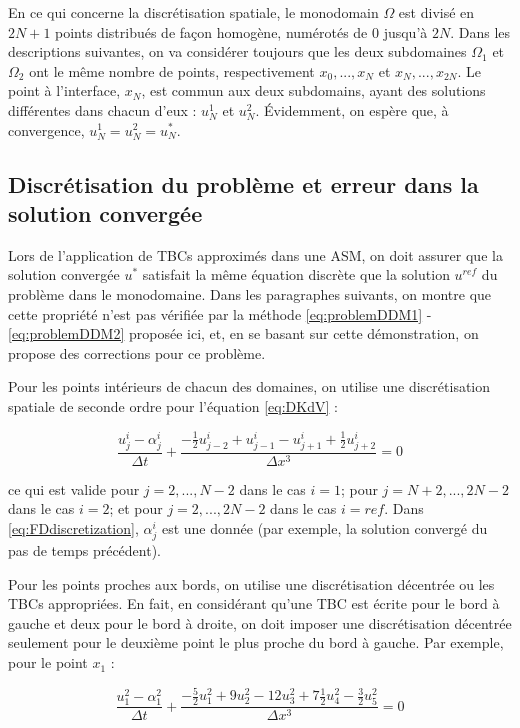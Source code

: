 \indent En ce qui concerne la discrétisation spatiale, le monodomain $\Omega$ est divisé en $2N+1$ points distribués de façon homogène, numérotés de $0$ jusqu'à $2N$. Dans les descriptions suivantes, on va considérer toujours que les deux subdomaines $\Omega_1$ et $\Omega_2$ ont le même nombre de points, respectivement  $x_0,...,x_N$ et $x_N,...,x_{2N}$. Le point à l'interface, $x_N$, est commun aux deux subdomains, ayant des solutions différentes dans chacun d'eux : $u_N^1$ et $u_N^2$. Évidemment, on espère que, à convergence, $u_N^1 = u_N^2 = u_N^*$.


\subsection{Discrétisation du problème et erreur dans la solution convergée}

\indent Lors de l'application de TBCs approximés dans une ASM, on doit assurer que la solution convergée $u^*$ satisfait la même équation discrète que la solution $u^{ref}$ du problème dans le monodomaine. Dans les paragraphes suivants, on montre que cette propriété n'est pas vérifiée par la méthode  \eqref{eq:problemDDM1} - \eqref{eq:problemDDM2} proposée ici, et, en se basant sur cette démonstration, on propose des corrections pour ce problème.

\indent Pour les points intérieurs de chacun des domaines, on utilise une discrétisation spatiale de seconde ordre pour l'équation \eqref{eq:DKdV} :

\begin{equation}
    \label{eq:FDdiscretization}
    \frac{u_j^i - \alpha_j^i}{\Delta t} + \frac{-\frac{1}{2}u_{j-2}^i + u_{j-1}^i - u_{j+1}^i + \frac{1}{2}u_{j+2}^i }{\Delta x ^3} = 0
\end{equation}

\noindent ce qui est valide pour $j=2,...,N-2$ dans le cas $i=1$; pour $j=N+2,...,2N-2$ dans le cas $i=2$; et pour $j=2,...,2N-2$ dans le cas $i=ref$. Dans \eqref{eq:FDdiscretization}, $\alpha_j^i$ est une donnée (par exemple, la solution convergé du pas de temps précédent).

\indent Pour les points proches aux bords, on utilise une discrétisation décentrée ou les TBCs appropriées. En fait, en considérant qu'une TBC est écrite pour le bord à gauche et deux pour le bord à droite, on doit imposer une discrétisation décentrée seulement pour le deuxième point le plus proche du bord à gauche. Par exemple, pour le point $x_1$ : 

\begin{equation*}
    \frac{u_{1}^2 - \alpha_{1}^2}{\Delta t} + \frac{-\frac{5}{2}u_{1}^2 + 9u_{2}^2 - 12 u_{3}^2 + 7\frac{1}{2}u_{4}^2 -\frac{3}{2}u_{5}^2}{\Delta x ^3} = 0
\end{equation*}

